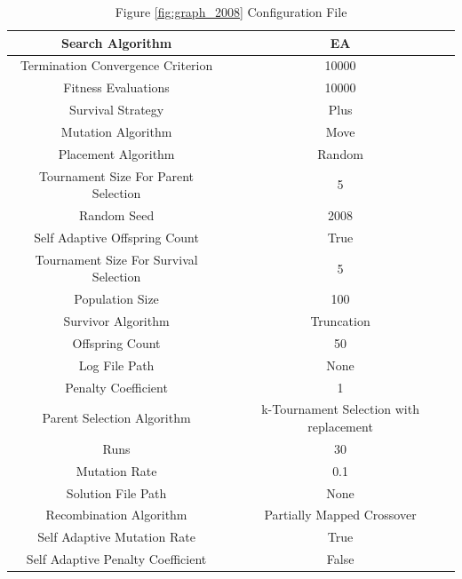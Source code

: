 \documentclass{standalone}
\begin{document}
\begin{table}[!htb]
	\centering
	\caption{Figure \ref{fig:graph_2008} Configuration File}
	\label{tab:graph_2008}
	\begin{tabular}{| c | c |}
		\hline
		Search Algorithm		& EA		 \\
		\hline
		Termination Convergence Criterion		& 10000		 \\
		\hline
		Fitness Evaluations		& 10000		 \\
		\hline
		Survival Strategy		& Plus		 \\
		\hline
		Mutation Algorithm		& Move		 \\
		\hline
		Placement Algorithm		& Random		 \\
		\hline
		Tournament Size For Parent Selection		& 5		 \\
		\hline
		Random Seed		& 2008		 \\
		\hline
		Self Adaptive Offspring Count		& True		 \\
		\hline
		Tournament Size For Survival Selection		& 5		 \\
		\hline
		Population Size		& 100		 \\
		\hline
		Survivor Algorithm		& Truncation		 \\
		\hline
		Offspring Count		& 50		 \\
		\hline
		Log File Path		& None		 \\
		\hline
		Penalty Coefficient		& 1		 \\
		\hline
		Parent Selection Algorithm		& k-Tournament Selection with replacement		 \\
		\hline
		Runs		& 30		 \\
		\hline
		Mutation Rate		& 0.1		 \\
		\hline
		Solution File Path		& None		 \\
		\hline
		Recombination Algorithm		& Partially Mapped Crossover		 \\
		\hline
		Self Adaptive Mutation Rate		& True		 \\
		\hline
		Self Adaptive Penalty Coefficient		& False		 \\
		\hline
	\end{tabular}
\end{table}
\end{document}
